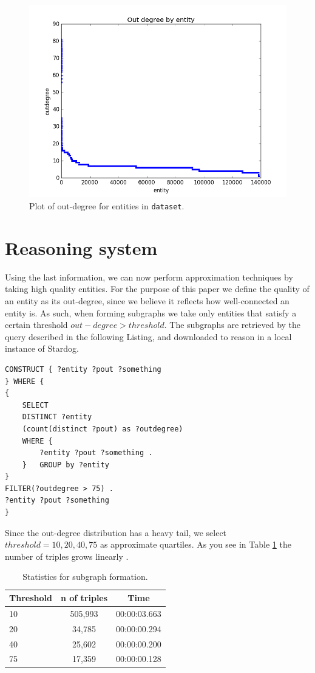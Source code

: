 \documentclass[runningheads,a4paper]{../../StyleFiles/llncs}
\begin{document}
\begin{figure}[h]
	\centering
	\includegraphics[width=.7\textwidth]{img/dataset_outdegree.png}
	\caption{Plot of out-degree for entities in \texttt{dataset}.}
	\label{fig:outdegree}
\end{figure}

\section{Reasoning system}
Using the last information, we can now perform approximation techniques by taking high quality entities. For the purpose of this paper we define the quality of an entity as its out-degree, since we believe it reflects how well-connected an entity is. As such, when forming subgraphs we take only entities that satisfy a certain threshold $ out-degree > threshold$. The subgraphs are retrieved by the query described in the following Listing, and downloaded to reason in a local instance of Stardog.

\begin{lstlisting}[captionpos=b, caption=SPARQL query for calculating out degree of entities, label=lst:sparql, basicstyle=\ttfamily\small,frame=bt]
CONSTRUCT { ?entity ?pout ?something
} WHERE { 
{
	SELECT
	DISTINCT ?entity
	(count(distinct ?pout) as ?outdegree)
	WHERE {
		?entity ?pout ?something .
	} 	GROUP by ?entity
}
FILTER(?outdegree > 75) .
?entity ?pout ?something
}
\end{lstlisting}

Since the out-degree distribution has a heavy tail, we select $threshold = 10, 20, 40, 75$ as approximate quartiles. As you see in Table \ref{subgraph_table} the number of triples grows linearly .

\begin{table}[h]
	\begin{center}
		\begin{tabular}{| l | c | c |}
			\hline
			\textbf{Threshold} & \textbf{n of triples} & \textbf{Time} \\ \hline
			10 &  505,993 & 00:00:03.663 \\ \hline
			20 & 34,785 & 00:00:00.294 \\ \hline
			40 & 25,602 & 00:00:00.200 \\ \hline
			75 & 17,359 & 00:00:00.128 \\ \hline
		\end{tabular}
		\caption{Statistics for subgraph formation.}
		\label{subgraph_table}
	\end{center}
\end{table}
\end{document}
